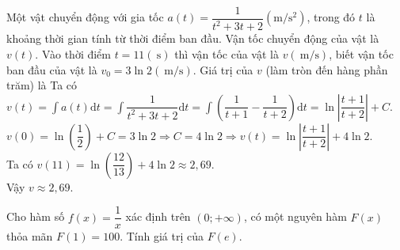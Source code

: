 \begin{bt}%
	Một vật chuyển động với gia tốc $a(t)=\dfrac{1}{t^2+3 t+2} \left(\mathrm{m} / \mathrm{s}^2\right)$, trong đó $t$ là khoảng thời gian tính từ thời điểm ban đầu. Vận tốc chuyển động của vật là $v(t)$. Vào thời điểm $t=11(\mathrm{~s})$ thì vận tốc của vật là $v(\mathrm{~m} / \mathrm{s})$, biết vận tốc ban đầu của vật là $v_0=3 \ln 2(\mathrm{~m} / \mathrm{s})$. Giá trị của $v$ (làm tròn đến hàng phần trăm) là
	\loigiai
	{Ta có $v(t)=\displaystyle\int\limits a(t) \mathrm{d}t=\displaystyle\int\limits\dfrac{1}{t^2+3 t+2} \mathrm{d}t=\displaystyle\int\limits\left(\dfrac{1}{t+1}-\dfrac{1}{t+2}\right) \mathrm{d}t=\ln \left|\dfrac{t+1}{t+2}\right|+C$.\\
		$v(0)=\ln \left(\dfrac{1}{2}\right)+C=3 \ln 2 \Rightarrow C=4 \ln 2 \Rightarrow v(t)=\ln \left|\dfrac{t+1}{t+2}\right|+4 \ln 2$.\\
		Ta có $v(11)=\ln \left(\dfrac{12}{13}\right)+4 \ln 2 \approx 2{,}69$.\\
		Vậy $v \approx 2{,}69$.
	}
\end{bt}

\begin{bt}%
	Cho hàm số $f(x)=\dfrac{1}{x}$ xác định trên $(0;+\infty)$, có một nguyên hàm $F(x)$ thỏa mãn $F(1)=100$. Tính giá  trị của $F(e)$.
\end{bt}

